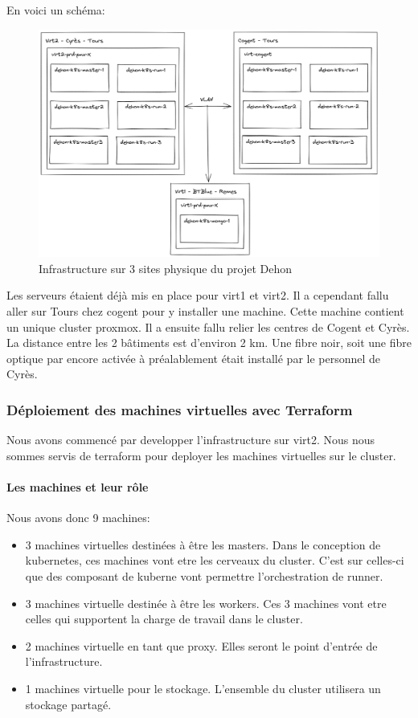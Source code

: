 \documentclass[12pt]{article}
\begin{document}
\newpage
En voici un schéma:
\begin{figure}
    \centering
        \includegraphics[width=\textwidth]{src/Dehon1.png}
    \caption{Infrastructure sur 3 sites physique du projet Dehon}
    \label{fig:dehon1}
\end{figure}

Les serveurs étaient déjà mis en place pour virt1 et virt2. 
Il a cependant fallu aller sur Tours chez cogent pour y installer une machine. 
Cette machine contient un unique cluster proxmox. 
Il a ensuite fallu relier les centres de Cogent et Cyrès. 
La distance entre les 2 bâtiments est d'environ 2 km. 
Une fibre noir, soit une fibre optique par encore activée à préalablement était installé par le personnel de Cyrès.


\subsubsection{Déploiement des machines virtuelles avec Terraform}
Nous avons commencé par developper l'infrastructure sur virt2. Nous nous sommes servis de terraform pour deployer les machines virtuelles sur le cluster. 

\paragraph{Les machines et leur rôle}
Nous avons donc 9 machines:

\begin{itemize}
    \item 3 machines virtuelles destinées à être les masters. 
    Dans le conception de kubernetes, ces machines vont etre les cerveaux du cluster.
    C'est sur celles-ci que des composant de kuberne vont permettre l'orchestration de runner.
    \item 3 machines virtuelle destinée à être les workers. 
    Ces 3 machines vont etre celles qui supportent la charge de travail dans le cluster.
    \item 2 machines virtuelle en tant que proxy. 
    Elles seront le point d'entrée de l'infrastructure. 
    \item 1 machines virtuelle pour le stockage. 
    L'ensemble du cluster utilisera un stockage partagé.
\end{itemize}
\end{document}
